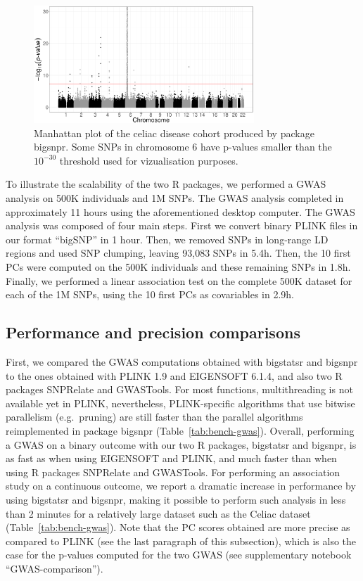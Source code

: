 \documentclass{bioinfo}
\begin{document}
\begin{figure}[!tpb]
\centerline{\includegraphics[width=235pt]{celiac-gwas-cut}}
\caption{Manhattan plot of the celiac disease cohort produced by package bigsnpr. Some SNPs in chromosome 6 have p-values smaller than the $10^{-30}$ threshold used for vizualisation purposes.}\label{fig:gwas}
\end{figure}

To illustrate the scalability of the two R packages, we performed a GWAS analysis on 500K individuals and 1M SNPs. The GWAS analysis completed in approximately 11 hours using the aforementioned desktop computer. The GWAS analysis was composed of four main steps. 
First we convert binary PLINK files in our format ``bigSNP'' in 1 hour.
Then, we removed SNPs in long-range LD regions and used SNP clumping, leaving 93,083 SNPs in 5.4h. Then, the 10 first PCs were computed on the 500K individuals and these remaining SNPs in 1.8h. Finally, we performed a linear association test on the complete 500K dataset for each of the 1M SNPs, using the 10 first PCs as covariables in 2.9h.

\subsection{Performance and precision comparisons}

First, we compared the GWAS computations obtained with bigstatsr and bigsnpr to the ones obtained with PLINK 1.9 and EIGENSOFT 6.1.4, and also two R packages SNPRelate and GWASTools.
For most functions, multithreading is not available yet in PLINK, nevertheless, PLINK-specific algorithms that use bitwise parallelism (e.g.\ pruning) are still faster than the parallel algorithms reimplemented in package bigsnpr (Table~\ref{tab:bench-gwas}). 
Overall, performing a GWAS on a binary outcome with our two R packages, bigstatsr and bigsnpr, is as fast as when using EIGENSOFT and PLINK, and much faster than when using R packages SNPRelate and GWASTools. 
For performing an association study on a continuous outcome, we report a dramatic increase in performance by using bigstatsr and bigsnpr, making it possible to perform such analysis in less than 2 minutes for a relatively large dataset such as the Celiac dataset (Table~\ref{tab:bench-gwas}).
Note that the PC scores obtained are more precise as compared to PLINK (see the last paragraph of this subsection), which is also the case for the p-values computed for the two GWAS (see supplementary notebook ``GWAS-comparison''). 
\end{document}

